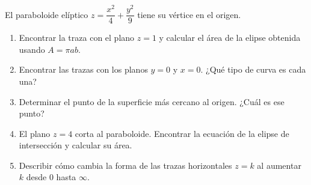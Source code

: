 El paraboloide elíptico $z = \dfrac{x^2}{4} + \dfrac{y^2}{9}$ tiene su vértice en el origen.
\begin{enumerate}
    \item Encontrar la traza con el plano $z = 1$ y calcular el área de la elipse obtenida usando $A = \pi ab$.
    \item Encontrar las trazas con los planos $y = 0$ y $x = 0$. ¿Qué tipo de curva es cada una?
    \item Determinar el punto de la superficie más cercano al origen. ¿Cuál es ese punto?
    \item El plano $z = 4$ corta al paraboloide. Encontrar la ecuación de la elipse de intersección y calcular su área.
    \item Describir cómo cambia la forma de las trazas horizontales $z = k$ al aumentar $k$ desde $0$ hasta $\infty$.
\end{enumerate}